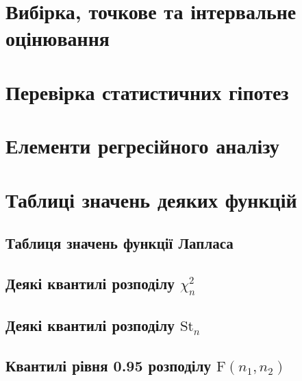 \documentclass{report}
\begin{document}
    \chapter{Вибірка, точкове та інтервальне оцінювання}
        
        
        
    \chapter{Перевірка статистичних гіпотез}
        
    \chapter{Елементи регресійного аналізу}
    \chapter*{Таблиці значень деяких функцій}
    \section*{Таблиця значень функції Лапласа}
        \newpage
    \section*{Деякі квантилі розподілу $\chi^2_{n}$}
        \newpage
    \section*{Деякі квантилі розподілу $\mathrm{St}_n$}
        \newpage
    \section*{Квантилі рівня 0.95 розподілу $\mathrm{F}(n_1, n_2)$}
        \newpage
\end{document}
